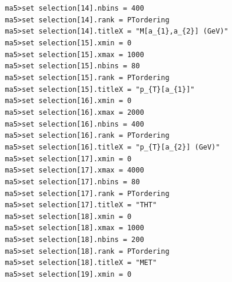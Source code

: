 \documentclass[a4paper, 10pt]{article}
\begin{document}
\texttt{ }\texttt{ }\texttt{ma5>set selection[14].nbins = 400\\
}
\texttt{ }\texttt{ }\texttt{ma5>set selection[14].rank = PTordering\\
}
\texttt{ }\texttt{ }\texttt{ma5>set selection[14].titleX = "M[a\_\{1\},a\_\{2\}] (GeV)"\\
}
\texttt{ }\texttt{ }\texttt{ma5>set selection[15].xmin = 0\\
}
\texttt{ }\texttt{ }\texttt{ma5>set selection[15].xmax = 1000\\
}
\texttt{ }\texttt{ }\texttt{ma5>set selection[15].nbins = 80\\
}
\texttt{ }\texttt{ }\texttt{ma5>set selection[15].rank = PTordering\\
}
\texttt{ }\texttt{ }\texttt{ma5>set selection[15].titleX = "p\_\{T\}[a\_\{1\}]"\\
}
\texttt{ }\texttt{ }\texttt{ma5>set selection[16].xmin = 0\\
}
\texttt{ }\texttt{ }\texttt{ma5>set selection[16].xmax = 2000\\
}
\texttt{ }\texttt{ }\texttt{ma5>set selection[16].nbins = 400\\
}
\texttt{ }\texttt{ }\texttt{ma5>set selection[16].rank = PTordering\\
}
\texttt{ }\texttt{ }\texttt{ma5>set selection[16].titleX = "p\_\{T\}[a\_\{2\}] (GeV)"\\
}
\texttt{ }\texttt{ }\texttt{ma5>set selection[17].xmin = 0\\
}
\texttt{ }\texttt{ }\texttt{ma5>set selection[17].xmax = 4000\\
}
\texttt{ }\texttt{ }\texttt{ma5>set selection[17].nbins = 80\\
}
\texttt{ }\texttt{ }\texttt{ma5>set selection[17].rank = PTordering\\
}
\texttt{ }\texttt{ }\texttt{ma5>set selection[17].titleX = "THT"\\
}
\texttt{ }\texttt{ }\texttt{ma5>set selection[18].xmin = 0\\
}
\texttt{ }\texttt{ }\texttt{ma5>set selection[18].xmax = 1000\\
}
\texttt{ }\texttt{ }\texttt{ma5>set selection[18].nbins = 200\\
}
\texttt{ }\texttt{ }\texttt{ma5>set selection[18].rank = PTordering\\
}
\texttt{ }\texttt{ }\texttt{ma5>set selection[18].titleX = "MET"\\
}
\texttt{ }\texttt{ }\texttt{ma5>set selection[19].xmin = 0\\
}
\end{document}
